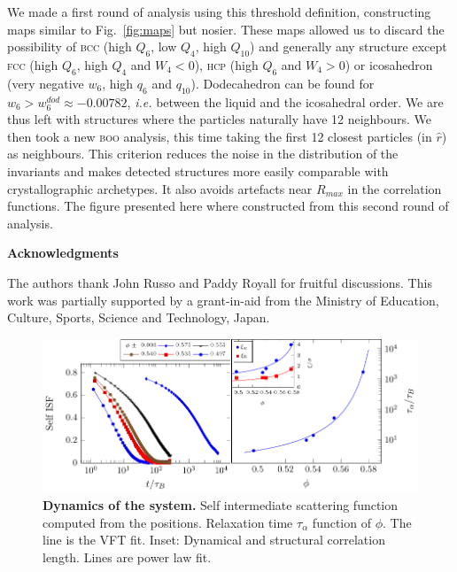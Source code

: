 We made a first round of analysis using this threshold definition, constructing maps similar to Fig.~\ref{fig:maps} but nosier. These maps allowed us to discard the possibility of \textsc{bcc} (high $Q_6$, low $Q_4$, high $Q_{10}$) and generally any structure except \textsc{fcc} (high $Q_6$, high $Q_4$ and $W_4<0$), \textsc{hcp} (high $Q_6$ and $W_4>0$) or icosahedron (very negative $w_6$, high $q_6$ and $q_{10}$). Dodecahedron can be found for $w_6>w_6^{dod}\approx -0.00782$, \emph{i.e.} between the liquid and the icosahedral order. We are thus left with structures where the particles naturally have 12 neighbours. We then took a new \textsc{boo} analysis, this time taking the first 12 closest particles (in $\hat{r}$) as neighbours. This criterion reduces the noise in the distribution of the invariants and makes detected structures more easily comparable with crystallographic archetypes. It also avoids artefacts near $R_{max}$ in the correlation functions. The figure presented here where constructed from this second round of analysis.

%



\vspace{2cm}
\noindent
\textbf{Acknowledgments}

\noindent
The authors thank John Russo and Paddy Royall for fruitful discussions. 
This work was partially supported by a grant-in-aid from the 
Ministry of Education, Culture, Sports, Science and Technology, Japan. 

\clearpage

\begin{figure}
\begin{center}
\includegraphics{generate_figures-figure0.pdf}
\end{center}
\caption{\textbf{Dynamics of the system.} Self intermediate scattering function computed from the positions. Relaxation time $\tau_\alpha$ function of $\phi$. The line is the VFT fit. Inset: Dynamical and structural correlation length. Lines are power law fit.}
	\label{fig:vft}
\end{figure}

